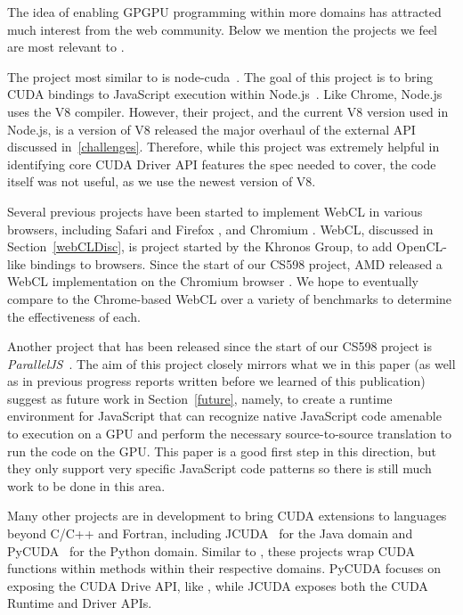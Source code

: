 
The idea of enabling GPGPU programming within more domains has attracted much
interest from the web community. Below we mention the projects we feel are most relevant
to \namens.

The project most similar to \name is node-cuda~\cite{nodeCuda}. The goal of
this project is to bring CUDA bindings to JavaScript execution within
Node.js~\cite{nodeJS}. Like Chrome, Node.js uses the V8 compiler. However,
their project, and the current V8 version used in Node.js, is a version of V8
released the major overhaul of the external API discussed in~\ref{challenges}.
Therefore, while this project was extremely helpful in identifying core CUDA
Driver API features the \name spec needed to cover, the code itself was not
useful, as we use the newest version of V8.

Several previous projects have been started to implement WebCL \cite{webCL} in
various browsers, including Safari \cite{safariCL} and Firefox \cite{nokiaCL},
and Chromium \cite{chromeCL}.  WebCL, discussed in Section~\ref{webCLDisc}, is
project started by the Khronos Group, to add OpenCL-like bindings to browsers.
Since the start of our CS598 project, AMD released a WebCL implementation on
the Chromium browser \cite{chromeCL}. We hope to eventually compare \name to
the Chrome-based WebCL over a variety of benchmarks to determine the
effectiveness of each.

Another project that has been released since the start of our CS598 project is
\textit{ParallelJS}~\cite{parallelJS}. The aim of this project closely mirrors
what we in this paper (as well as in previous progress reports written before we
learned of this publication) suggest as future work in Section~\ref{future}, namely, to create a
runtime environment for JavaScript that can recognize native JavaScript code amenable to
execution on a GPU and perform the necessary source-to-source translation to run
the code on the GPU. This paper is a good first step in this direction, but
they only support very specific JavaScript code patterns so there is still much
work to be done in this area.

Many other projects are in development to bring CUDA extensions to languages
beyond C/C++ and Fortran, including JCUDA~\cite{jcuda} for the Java domain and
PyCUDA~\cite{pycuda} for the Python domain.  Similar to \namens, these projects
wrap CUDA functions within methods within their respective domains. PyCUDA
focuses on exposing the CUDA Drive API, like \namens, while JCUDA exposes both
the CUDA Runtime and Driver APIs.


